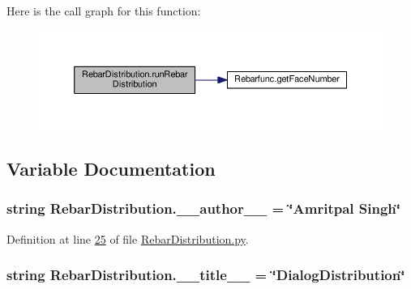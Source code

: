 Here is the call graph for this function\+:\nopagebreak
\begin{figure}[H]
\begin{center}
\leavevmode
\includegraphics[width=350pt]{namespaceRebarDistribution_aa547df5cb10d2e64eaa0b51c445fa30b_cgraph}
\end{center}
\end{figure}




\subsection{Variable Documentation}
\subsubsection[{\texorpdfstring{\+\_\+\+\_\+author\+\_\+\+\_\+}{__author__}}]{\setlength{\rightskip}{0pt plus 5cm}string Rebar\+Distribution.\+\_\+\+\_\+author\+\_\+\+\_\+ = \char`\"{}Amritpal Singh\char`\"{}\hspace{0.3cm}{\ttfamily [private]}}\hypertarget{namespaceRebarDistribution_a7bd0602448fa39ff800847e313ca8b25}{}\label{namespaceRebarDistribution_a7bd0602448fa39ff800847e313ca8b25}


Definition at line \hyperlink{RebarDistribution_8py_source_l00025}{25} of file \hyperlink{RebarDistribution_8py_source}{Rebar\+Distribution.\+py}.

\subsubsection[{\texorpdfstring{\+\_\+\+\_\+title\+\_\+\+\_\+}{__title__}}]{\setlength{\rightskip}{0pt plus 5cm}string Rebar\+Distribution.\+\_\+\+\_\+title\+\_\+\+\_\+ = \char`\"{}Dialog\+Distribution\char`\"{}\hspace{0.3cm}{\ttfamily [private]}}\hypertarget{namespaceRebarDistribution_a38609d6513215400fb6b4c0d1b7f2040}{}\label{namespaceRebarDistribution_a38609d6513215400fb6b4c0d1b7f2040}


